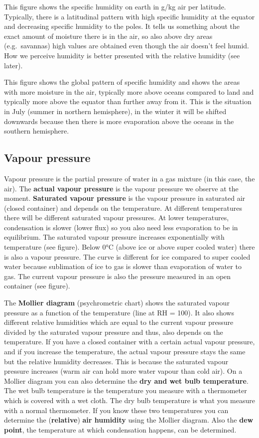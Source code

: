 \documentclass[oneside]{book}
\begin{document}
This figure shows the specific humidity on earth in g/kg air per
latitude. Typically, there is a latitudinal pattern with high specific
humidity at the equator and decreasing specific humidity to the poles.
It tells us something about the exact amount of moisture there is in the
air, so also above dry areas (e.g.~savannas) high values are obtained
even though the air doesn't feel humid. How we perceive humidity is
better presented with the relative humidity (see later).

This figure shows the global pattern of specific humidity and shows the
areas with more moisture in the air, typically more above oceans
compared to land and typically more above the equator than further away
from it. This is the situation in July (summer in northern hemisphere),
in the winter it will be shifted downwards because then there is more
evaporation above the oceans in the southern hemisphere.

\subsection{Vapour pressure}\label{vapour-pressure}

Vapour pressure is the partial pressure of water in a gas mixture (in
this case, the air). The \textbf{actual vapour pressure} is the vapour
pressure we observe at the moment. \textbf{Saturated vapour pressure} is
the vapour pressure in saturated air (closed container) and depends on
the temperature. At different temperatures there will be different
saturated vapour pressures. At lower temperatures, condensation is
slower (lower flux) so you also need less evaporation to be in
equilibrium. The saturated vapour pressure increases exponentially with
temperature (see figure). Below 0°C (above ice or above super cooled
water) there is also a vapour pressure. The curve is different for ice
compared to super cooled water because sublimation of ice to gas is
slower than evaporation of water to gas. The current vapour pressure is
also the pressure measured in an open container (see figure).

The \textbf{Mollier diagram} (psychrometric chart) shows the saturated
vapour pressure as a function of the temperature (line at RH = 100). It
also shows different relative humidities which are equal to the current
vapour pressure divided by the saturated vapour pressure and thus, also
depends on the temperature. If you have a closed container with a
certain actual vapour pressure, and if you increase the temperature, the
actual vapour pressure stays the same but the relative humidity
decreases. This is because the saturated vapour pressure increases (warm
air can hold more water vapour than cold air). On a Mollier diagram you
can also determine the \textbf{dry and wet bulb temperature}. The wet
bulb temperature is the temperature you measure with a thermometer which
is covered with a wet cloth. The dry bulb temperature is what you
measure with a normal thermometer. If you know these two temperatures
you can determine the (\textbf{relative}) \textbf{air humidity} using
the Mollier diagram. Also the \textbf{dew point}, the temperature at
which condensation happens, can be determined.
\end{document}
